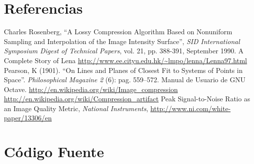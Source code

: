 \documentclass[twocolumn,a4paper,10pt]{article}
\begin{document}
\section*{Referencias}
\begin{thebibliography}{99}
    
    Charles Rosenberg, ``A Lossy Compression Algorithm Based on Nonuniform Sampling and Interpolation of the Image Intensity Surface'', \textit{SID International Symposium Digest of Technical Papers}, vol. 21, pp. 388-391, September 1990.
    A Complete Story of Lena \url{http://www.ee.cityu.edu.hk/~lmpo/lenna/Lenna97.html}
     Pearson, K (1901). ``On Lines and Planes of Closest Fit to Systems of Points in Space''. \textit{Philosophical Magazine 2} (6): pag. 559–572.
     Manual de Usuario de GNU Octave.
     \url{http://en.wikipedia.org/wiki/Image\_compression}
     \url{http://en.wikipedia.org/wiki/Compression\_artifact}
     Peak Signal-to-Noise Ratio as an Image Quality Metric, \textit{National Instruments}, \url{http://www.ni.com/white-paper/13306/en}

\end{thebibliography}

\section*{Código Fuente}
    
    
\end{document}
